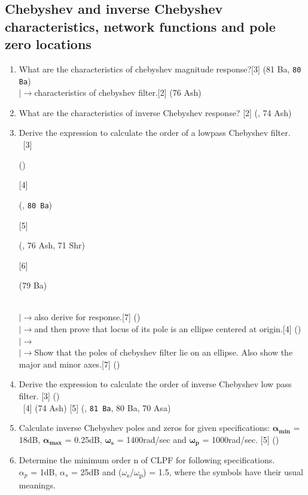 \documentclass[12pt]{article}
\newcommand{\w}{\(\omega\)}
\newcommand{\lb}{\\$\left|\rightarrow\right.$}
\newcommand{\enter}{\\\textcolor{white}{1}}
\begin{document}
		\subsection{Chebyshev and inverse Chebyshev characteristics, network functions and pole zero locations}
			\begin{enumerate}
				\item What are the characteristics of chebyshev magnitude response?\hfill [3] (81 Ba, \texttt{80 Ba})
				\lb characteristics of chebyshev filter.\hfill[2] (76 Ash)

				\item What are the characteristics of inverse Chebyshev response? \hfill [2] (, 74 Ash)

				\item Derive the expression to calculate the order of a lowpass Chebyshev filter.
				\enter\hfill[3] \begin{small}()\end{small} [4] \begin{small}(, \texttt{80 Ba})\end{small} [5] \begin{small}(, 76 Ash, 71 Shr)\end{small} [6] \begin{small}(79 Ba)\end{small}
				\lb  also derive for response.\hfill[7] ()
				\lb and then prove that locus of its pole is an ellipse centered at origin.\hfill[4] ()
				\lb\lb Show that the poles of chebyshev filter lie on an ellipse. Also show the major and minor axes.\hfill[7] ()

				\item Derive the expression to calculate the order of inverse Chebyshev low pass filter. \hfill [3] ()
				\enter \hfill[4] (74 Ash) [5] (, \texttt{81 Ba}, 80 Ba, 70 Asa)

				\item Calculate inverse Chebyshev poles and zeros for given specifications: $\boldsymbol{\alpha_{min}}$ = 18dB, $\boldsymbol{\alpha_{max}}$ = 0.25dB, $\boldsymbol{\omega_s}$ = 1400rad/sec and $\boldsymbol{\omega_p}$ = 1000rad/sec. \hfill [5] ()

				\item Determine the  minimum order n of CLPF for following specifications.\\
				$\alpha_p$ = 1dB, $\alpha_s$ = 25dB and (\w\textsubscript{s}/\w\textsubscript{p}) = 1.5, where the symbols have their usual meanings.


\end{enumerate}
\end{document}
